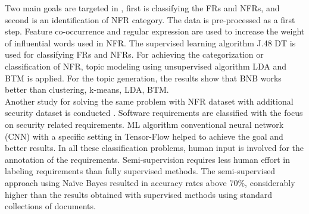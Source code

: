 	Two main goals are targeted in \cite{Abad},
first is classifying the FRs and NFRs, and second is an identification of NFR category. The data is
pre-processed as a first step. Feature co-occurrence and regular expression are used to increase
the weight of influential words used in NFR. The supervised learning algorithm J.48 DT is used
for classifying FRs and NFRs. For achieving the categorization or classification of NFR,
topic modeling using unsupervised algorithm LDA and BTM is applied. For the topic generation, the results show  that BNB works better than clustering, k-means, LDA, BTM. \\


	Another study for solving the same problem with NFR dataset with additional security dataset is conducted \cite{Dekhtyar}.
Software requirements are classified with the focus on security related requirements. ML algorithm
conventional neural network (CNN) with a specific setting in Tensor-Flow helped to achieve the goal and better results. In all
these classification problems, human input is involved for the annotation of the requirements.
Semi-supervision requires less human effort in labeling requirements than fully supervised
methods. The semi-supervised approach \cite{Casamayor} using Naïve Bayes resulted in accuracy rates
above 70\%, considerably higher than the results obtained with supervised methods using
standard collections of documents.